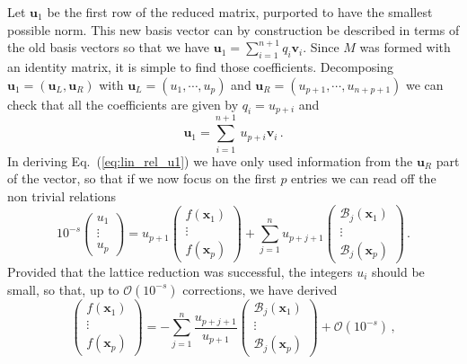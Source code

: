 \documentclass[a4paper,11pt]{article}
\begin{document}
Let $\mathbf{u}_1$ be the first row of the reduced matrix, purported to have the smallest possible norm. This new basis vector can by construction be described in terms of the old basis vectors so that we have $\mathbf{u}_1= \sum_{i=1}^{n+1} q_i \mathbf{v}_{i}$. Since $M$ was formed with an identity matrix, it is simple to find those coefficients. Decomposing $\mathbf{u}_1=(\mathbf{u}_L, \mathbf{u}_R)$ with $\mathbf{u}_L = (u_1, \cdots, u_p)$ and $\mathbf{u}_R = (u_{p+1}, \cdots, u_{n+p+1})$ we can check that all the coefficients are given by $q_i = u_{p+i}$ and 
\begin{equation} \label{eq:lin_rel_u1}
    \mathbf{u}_1 = \sum_{i=1}^{n+1} \, u_{p+i} \mathbf{v}_i \,.
\end{equation}
In deriving Eq.~(\ref{eq:lin_rel_u1}) we have only used information from the $\mathbf{u}_R$ part of the vector, so that if we now focus on the first $p$ entries we can read off the non trivial relations 
\begin{equation}
   10^{-s}  \begin{pmatrix}
        u_1 \\
        \vdots\\
        u_p
    \end{pmatrix}=  u_{p+1} \begin{pmatrix}
        f(\mathbf{x}_1) \\
        \vdots\\
        f(\mathbf{x}_p) 
    \end{pmatrix} +   \sum_{j=1}^{n} u_{p+j+1} \begin{pmatrix}
        \mathcal{B}_j(\mathbf{x}_1) \\
        \vdots\\
        \mathcal{B}_j(\mathbf{x}_p)
    \end{pmatrix} \,.
\end{equation}
Provided that the lattice reduction was successful, the integers $u_i$ should be small, so that, up to $\mathcal{O}(10^{-s})$ corrections, we have derived 
\begin{equation}
 \begin{pmatrix}
        f(\mathbf{x}_1) \\
        \vdots\\
        f(\mathbf{x}_p) 
    \end{pmatrix} = -   \sum_{j=1}^{n} \frac{u_{p+j+1}}{u_{p+1}} \begin{pmatrix}
        \mathcal{B}_j(\mathbf{x}_1) \\
        \vdots\\
        \mathcal{B}_j(\mathbf{x}_p)
    \end{pmatrix} + \mathcal{O}(10^{-s})\,,
\end{equation}
\end{document}
